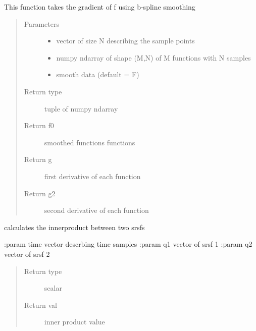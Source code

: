 \documentclass[letterpaper,10pt,english]{sphinxmanual}
\begin{document}
\begin{fulllineitems}
\label{\detokenize{utility_functions:utility_functions.gradient_spline}}
This function takes the gradient of f using b-spline smoothing
\begin{quote}\begin{description}
\item[{Parameters}] \leavevmode\begin{itemize}
\item {} 
 \textendash{} vector of size N describing the sample points

\item {} 
 \textendash{} numpy ndarray of shape (M,N) of M functions with N samples

\item {} 
 \textendash{} smooth data (default = F)

\end{itemize}

\item[{Return type}] \leavevmode
tuple of numpy ndarray

\item[{Return f0}] \leavevmode
smoothed functions functions

\item[{Return g}] \leavevmode
first derivative of each function

\item[{Return g2}] \leavevmode
second derivative of each function

\end{description}\end{quote}

\end{fulllineitems}


\begin{fulllineitems}
\label{\detokenize{utility_functions:utility_functions.innerprod_q}}
calculates the innerproduct between two srsfs

:param time vector descrbing time samples
:param q1 vector of srsf 1
:param q2 vector of srsf 2
\begin{quote}\begin{description}
\item[{Return type}] \leavevmode
scalar

\item[{Return val}] \leavevmode
inner product value

\end{description}\end{quote}

\end{fulllineitems}
\end{document}

